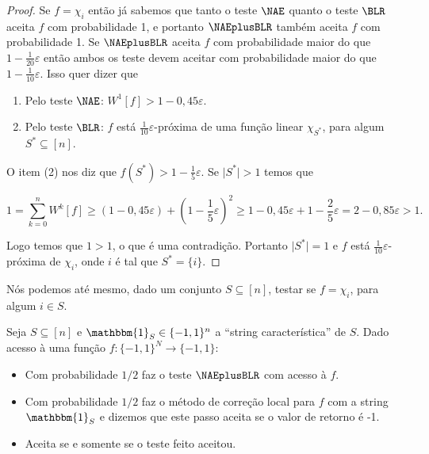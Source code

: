 \begin{proof}

Se $f = \chi_{i}$ então já sabemos que tanto o teste $\NAE$ quanto o teste $\BLR$ aceita $f$ com probabilidade 1, e portanto $\NAEplusBLR$ também aceita $f$ com probabilidade 1. Se $\NAEplusBLR$ aceita $f$ com probabilidade maior do que $1 - \frac{1}{20}\varepsilon$ então ambos os teste devem aceitar com probabilidade maior do que $1 - \frac{1}{10}\varepsilon$. Isso quer dizer que

\begin{enumerate}

	\item Pelo teste $\NAE$: $W^{1}[f] > 1 - 0,45\varepsilon$.
	
	\item Pelo teste $\BLR$: $f$ está $\frac{1}{10}\varepsilon$-próxima de uma função linear $\chi_{S^{*}}$, para algum $S^{*} \subseteq [n]$.

\end{enumerate}

O item (2) nos diz que $\widehat{f}(S^{*}) > 1 - \frac{1}{5}\varepsilon$. Se $\lvert S^{*} \rvert > 1$ temos que

\begin{equation*}
	1 = \sum_{k = 0}^{n}W^{k}[f] \geq (1 - 0,45\varepsilon) + (1 - \frac{1}{5}\varepsilon)^{2} \geq 1 - 0,45\varepsilon + 1 -\frac{2}{5}\varepsilon = 2 - 0,85\varepsilon > 1.
\end{equation*}

Logo temos que $1 > 1$, o que é uma contradição. Portanto $\lvert S^{*} \rvert = 1$ e $f$ está $\frac{1}{10}\varepsilon$-próxima de $\chi_{i}$, onde $i$ é tal que $S^{*} = \{i\}$.

\end{proof}

Nós podemos até mesmo, dado um conjunto $S \subseteq [n]$, testar se $f = \chi_{i}$, para algum $i \in S$.

\begin{dicttest} \label{dict_subset_test}

Seja $S \subseteq[n]$ e $\mathbbm{1}_{S} \in \{-1, 1\}^{n}$ a ``string característica'' de $S$. Dado acesso à uma função $f: \{-1, 1\}^{N} \to \{-1, 1\}$:

\begin{itemize}

	\item Com probabilidade $1/2$ faz o teste $\NAEplusBLR$ com acesso à $f$.
	
	\item Com probabilidade $1/2$ faz o método de correção local para $f$ com a string $\mathbbm{1}_{S}$ e dizemos que este passo aceita se o valor de retorno é -1.
	
	\item Aceita se e somente se o teste feito aceitou.

\end{itemize}

\end{dicttest}

